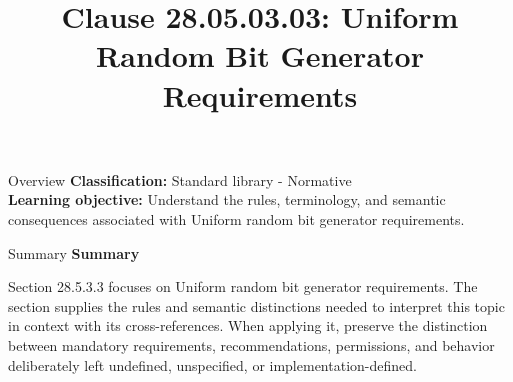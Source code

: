 \documentclass[10pt,letterpaper]{article}
\title{Clause 28.05.03.03: Uniform Random Bit Generator Requirements}
\author{}
\date{}
\begin{document}
\maketitle
\begin{CornellOverviewBox}{Overview}
\textbf{Classification:} Standard library - Normative\\[2pt]
\textbf{Learning objective:} Understand the rules, terminology, and semantic consequences associated with Uniform random bit generator requirements.
\end{CornellOverviewBox}\begin{CornellSummaryBox}{Summary}
{\sffamily\bfseries\color{Accent} Summary}\par\vspace{3pt}Section 28.5.3.3 focuses on Uniform random bit generator requirements. The section supplies the rules and semantic distinctions needed to interpret this topic in context with its cross-references. When applying it, preserve the distinction between mandatory requirements, recommendations, permissions, and behavior deliberately left undefined, unspecified, or implementation-defined.
\end{CornellSummaryBox}
\end{document}

